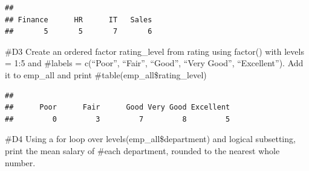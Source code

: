\documentclass[
]{article}
\newenvironment{Shaded}{\begin{snugshade}}{\end{snugshade}}
\newcommand{\AttributeTok}[1]{\textcolor[rgb]{0.13,0.29,0.53}{#1}}
\newcommand{\CommentTok}[1]{\textcolor[rgb]{0.56,0.35,0.01}{\textit{#1}}}
\newcommand{\ConstantTok}[1]{\textcolor[rgb]{0.56,0.35,0.01}{#1}}
\newcommand{\ControlFlowTok}[1]{\textcolor[rgb]{0.13,0.29,0.53}{\textbf{#1}}}
\newcommand{\DecValTok}[1]{\textcolor[rgb]{0.00,0.00,0.81}{#1}}
\newcommand{\FunctionTok}[1]{\textcolor[rgb]{0.13,0.29,0.53}{\textbf{#1}}}
\newcommand{\NormalTok}[1]{#1}
\newcommand{\OtherTok}[1]{\textcolor[rgb]{0.56,0.35,0.01}{#1}}
\newcommand{\SpecialCharTok}[1]{\textcolor[rgb]{0.81,0.36,0.00}{\textbf{#1}}}
\newcommand{\StringTok}[1]{\textcolor[rgb]{0.31,0.60,0.02}{#1}}
\begin{document}
\begin{Shaded}
\end{Shaded}

\begin{verbatim}
## 
## Finance      HR      IT   Sales 
##       5       5       7       6
\end{verbatim}

\#D3 Create an ordered factor rating\_level from rating using factor()
with levels = 1:5 and \#labels = c(``Poor'', ``Fair'', ``Good'', ``Very
Good'', ``Excellent''). Add it to emp\_all and print
\#table(emp\_all\$rating\_level)

\begin{Shaded}
\end{Shaded}

\begin{verbatim}
## 
##      Poor      Fair      Good Very Good Excellent 
##         0         3         7         8         5
\end{verbatim}

\#D4 Using a for loop over levels(emp\_all\$department) and logical
subsetting, print the mean salary of \#each department, rounded to the
nearest whole number.

\begin{Shaded}
\end{Shaded}
\end{document}

